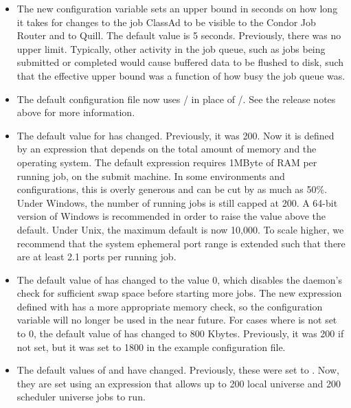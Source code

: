 \begin{itemize}

\item The new configuration variable 
   sets an
  upper bound in seconds on how long it takes for changes to the job
  ClassAd to be visible to the Condor Job Router and to Quill.
  The default value is 5 seconds.
  Previously, there was no upper limit.  Typically, other activity in
  the job queue, such as jobs being submitted or completed would cause
  buffered data to be flushed to disk, such that the effective upper bound was
  a function of how busy the job queue was.

\item The default configuration file now uses
  / in place of
  /.  See the release notes above
  for more information.

\item The default value for  has changed.
  Previously, it was 200.  Now it is defined by an expression that depends 
  on the total amount of memory and the operating system.  The default
  expression requires 1MByte of RAM per running job, on the submit machine.
  In some environments and configurations, this is overly
  generous and can be cut by as much as 50\%.  Under Windows, the
  number of running jobs is still capped at 200.
  A 64-bit version of Windows  is recommended in order to raise the value
  above the default.
  Under Unix, the maximum default is now 10,000.  To scale higher, we
  recommend that the system ephemeral port range is extended
  such that there are at least 2.1 ports per running job.

\item The default value of  has changed to
  the value 0, which
  disables the  daemon's check for sufficient swap space
  before starting more jobs.  The new expression defined with 
   has a more appropriate memory check, so
  the configuration variable  will no longer
  be used in the near future.
  For cases where 
   is not set to 0, the default value
  of  has changed to 800 Kbytes.
  Previously, it was 200 if not set,
  but it was set to 1800 in the example configuration file.

\item The default values of  and
   have changed.  Previously,
  these were set to .  Now, they are set using an expression
  that allows
  up to 200 local universe and 200 scheduler universe jobs to run.


\end{itemize}
